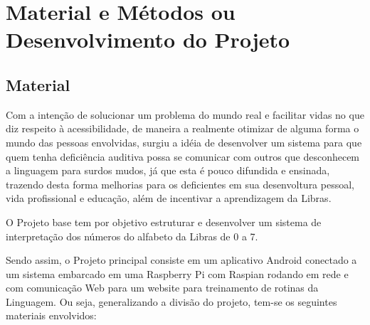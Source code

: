 \chapter{Material e Métodos ou Desenvolvimento do Projeto}
\label{Material}


\section{Material}
\par Com a intenção de solucionar um problema do mundo real e facilitar vidas no que diz respeito à acessibilidade, de maneira a realmente otimizar de alguma forma o mundo das pessoas envolvidas, surgiu a idéia de desenvolver um sistema para que quem tenha deficiência auditiva possa se comunicar com outros que desconhecem a linguagem para surdos mudos, já que esta é pouco difundida e ensinada, trazendo desta forma melhorias para os deficientes em sua desenvoltura pessoal, vida profissional e educação, além de incentivar a aprendizagem da Libras. 

\par O Projeto base tem por objetivo estruturar e desenvolver um sistema de interpretação dos números do alfabeto da Libras de 0 a 7.

\par Sendo assim, o Projeto principal consiste em um aplicativo Android conectado a um sistema embarcado em uma Raspberry Pi com Raspian rodando em rede e com comunicação Web para um website para treinamento de rotinas da Linguagem. Ou seja, generalizando a divisão do projeto, tem-se os seguintes materiais envolvidos:

